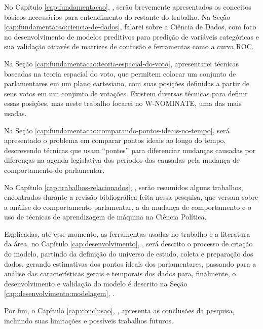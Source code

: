 No Capítulo \ref{cap:fundamentacao}, , serão
brevemente apresentados os conceitos básicos necessários para entendimento do
restante do trabalho. Na Seção \ref{cap:fundamentacao:ciencia-de-dados}, falarei
sobre a Ciência de Dados, com foco no desenvolvimento de modelos preditivos
para predição de variáveis categóricas e sua validação através de matrizes de
confusão e ferramentas como a curva \gls{ROC}.

Na Seção \ref{cap:fundamentacao:teoria-espacial-do-voto}, apresentarei técnicas
baseadas na teoria espacial do voto, que permitem colocar um conjunto de
parlamentares em um plano cartesiano, com suas posições definidas a partir de
seus votos em um conjunto de votações. Existem diversas técnicas para definir
essas posições, mas neste trabalho focarei no W-NOMINATE, uma das mais usadas.

Na Seção \ref{cap:fundamentacao:comparando-pontos-ideais-no-tempo}, será
apresentado o problema em comparar pontos ideais ao longo do tempo, descrevendo
técnicas que usam ``pontes'' para diferenciar mudanças causadas por diferenças
na agenda legislativa dos períodos das causadas pela mudança de comportamento
do parlamentar.

No Capítulo \ref{cap:trabalhos-relacionados},
, serão resumidos alguns trabalhos,
encontrados durante a revisão bibliográfica feita nessa pesquisa, que versam
sobre a análise do comportamento parlamentar, a da mudança de comportamento e o
uso de técnicas de aprendizagem de máquina na Ciência Política.

Explicadas, até esse momento, as ferramentas usadas no trabalho e a literatura
da área, no Capítulo \ref{cap:desenvolvimento}, ,
será descrito o processo de criação do modelo, partindo da definição do
universo de estudo, coleta e preparação dos dados, gerando estimativas dos
pontos ideais dos parlamentares, passando para a análise das características
gerais e temporais dos dados para, finalmente, o desenvolvimento e validação do
modelo é descrito na Seção \ref{cap:desenvolvimento:modelagem},
.

Por fim, o Capítulo \ref{cap:conclusao}, , apresenta as
conclusões da pesquisa, incluindo suas limitações e possíveis trabalhos futuros.

